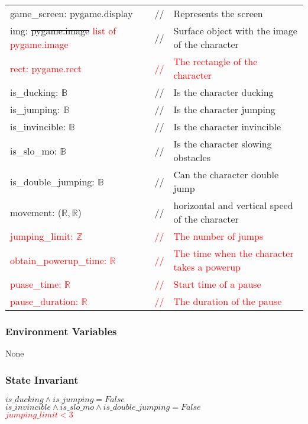 \documentclass[12pt]{article}
\begin{document}
\begin{tabular}{lll}
    game\_screen: pygame.display & // & Represents the screen \\
    img: \sout{pygame.image} \textcolor{red}{list of pygame.image} & // & Surface object with the image of the character\\
    \textcolor{red}{rect: pygame.rect} & \textcolor{red}{//} & \textcolor{red}{The rectangle of the character}\\
    is\_ducking: $\mathbb{B}$ & // & Is the character ducking\\
    is\_jumping: $\mathbb{B}$ & // & Is the character jumping\\
    is\_invincible: $\mathbb{B}$ & // & Is the character invincible\\
    is\_slo\_mo: $\mathbb{B}$ & // & Is the character slowing obstacles\\
    is\_double\_jumping: $\mathbb{B}$ & // & Can the character double jump\\
    movement: ($\mathbb{R,R}$) & // & horizontal and vertical speed of the character\\    \textcolor{red}{jumping\_limit: $\mathbb{Z}$} & \textcolor{red}{//} & \textcolor{red}{The number of jumps}\\
    \textcolor{red}{obtain\_powerup\_time: $\mathbb{R}$} & \textcolor{red}{//} & \textcolor{red}{The time when the character takes a powerup}\\
    \textcolor{red}{puase\_time: $\mathbb{R}$} & \textcolor{red}{//} & \textcolor{red}{Start time of a pause}\\
    \textcolor{red}{pause\_duration: $\mathbb{R}$} & \textcolor{red}{//} & \textcolor{red}{The duration of the pause}\\
    
\end{tabular}

\subsubsection* {Environment Variables}
None
\subsubsection* {State Invariant}

$is\_ducking \land is\_jumping = False$\\
$is\_invincible \land is\_slo\_mo \land is\_double\_jumping = False$\\
\textcolor{red}{$jumping\_limit < 3$}\\
\end{document}
